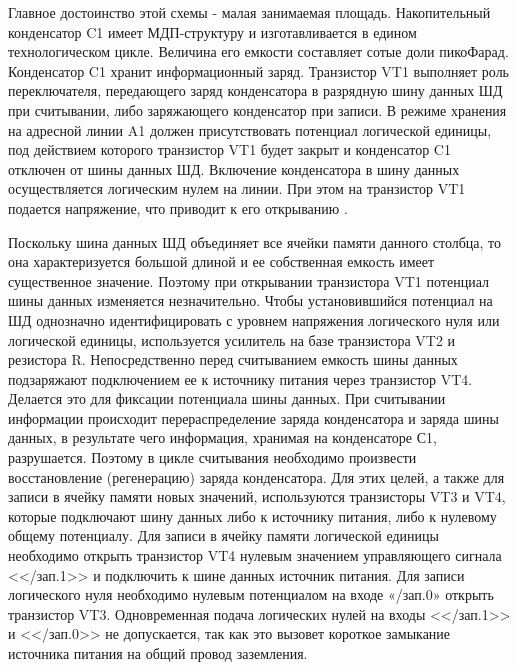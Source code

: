Главное достоинство этой схемы - малая занимаемая площадь. Накопительный конденсатор C1 имеет МДП-структуру и изготавливается в едином технологическом цикле. Величина его емкости составляет сотые доли пикоФарад. Конденсатор C1 хранит информационный заряд. Транзистор VT1 выполняет роль переключателя, передающего заряд конденсатора в разрядную шину данных ШД при считывании, либо заряжающего конденсатор при записи. В режиме хранения на адресной линии A1 должен присутствовать потенциал логической единицы, под действием которого транзистор VT1 будет закрыт и конденсатор C1 отключен от шины данных ШД. Включение конденсатора в шину данных осуществляется логическим нулем на линии. При этом на транзистор VT1 подается напряжение, что приводит к его открыванию \cite{ibm_dram_article}.

Поскольку шина данных ШД объединяет все ячейки памяти данного столбца, то она характеризуется большой длиной и ее собственная емкость имеет существенное значение. Поэтому при открывании транзистора VT1 потенциал шины данных изменяется незначительно. Чтобы установившийся потенциал на ШД однозначно идентифицировать с уровнем напряжения логического нуля или логической единицы, используется усилитель на базе транзистора VT2 и резистора R. Непосредственно перед считыванием емкость шины данных подзаряжают подключением ее к источнику питания через транзистор VT4. Делается это для фиксации потенциала шины данных. При считывании информации происходит перераспределение заряда конденсатора и заряда шины данных, в результате чего информация, хранимая на конденсаторе С1, разрушается. Поэтому в цикле считывания необходимо произвести восстановление (регенерацию) заряда конденсатора. Для этих целей, а также для записи в ячейку памяти новых значений, используются транзисторы VT3 и VT4, которые подключают шину данных либо к источнику питания, либо к нулевому общему потенциалу. Для записи в ячейку памяти логической единицы необходимо открыть транзистор VT4 нулевым значением управляющего сигнала <</зап.1>> и подключить к шине данных источник питания. Для записи логического нуля необходимо нулевым потенциалом на входе «/зап.0» открыть транзистор VT3. Одновременная подача логических нулей на входы <</зап.1>>  и <</зап.0>> не допускается, так как это вызовет короткое замыкание источника питания на общий провод заземления.

